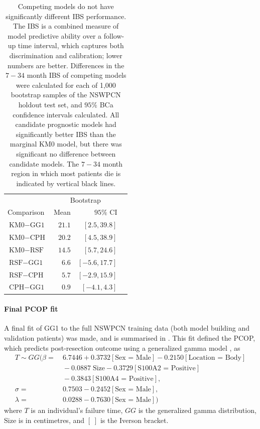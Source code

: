 \documentclass[dissertation.tex]{subfiles}
\begin{document}
\begin{table}
\centering
\caption[Prognostic model \acrshort{IBS} comparison]{Competing models do not have significantly different \gls{IBS} performance.  The \gls{IBS} is a combined measure of model predictive ability over a follow-up time interval, which captures both discrimination and calibration; lower numbers are better.  Differences in the $7-34$ month \gls{IBS} of competing models were calculated for each of 1,000 bootstrap samples of the \gls{NSWPCN} holdout test set, and $95\%$ BCa confidence intervals \cite{Efron1987} calculated.  All candidate prognostic models had significantly better \gls{IBS} than the marginal KM0 model, but there was significant no difference between candidate models.  The $7-34$ month region in which most patients die is indicated by vertical black lines.}
\label{tab:nomo-ibs-boot}
\begin{tabular}{lrrr}
\toprule
                             & \multicolumn{2}{c}{Bootstrap}   \\ \cmidrule(r){2-3}
Comparison                   & Mean          & $95\%$ CI       \\ \midrule
$\mbox{KM0} - \mbox{GG1}$    & $21.1$        & $[2.5, 39.8]$   \\
$\mbox{KM0} - \mbox{CPH}$    & $20.2$        & $[4.5, 38.9]$   \\
$\mbox{KM0} - \mbox{RSF}$    & $14.5$        & $[5.7, 24.6]$   \\
$\mbox{RSF} - \mbox{GG1}$    &  $6.6$        & $[-5.6, 17.7]$  \\
$\mbox{RSF} - \mbox{CPH}$    &  $5.7$        & $[-2.9, 15.9]$  \\ 
$\mbox{CPH} - \mbox{GG1}$    &  $0.9$        & $[-4.1, 4.3]$   \\ \bottomrule
\end{tabular}
\end{table}

\paragraph{Final \acrshort{PCOP} fit}
A final fit of GG1 to the full \gls{NSWPCN} training data (both model building and validation patients) was made, and is summarised in .  This fit defined the \gls{PCOP}, which predicts post-resection outcome using a generalized gamma model \cite{Cox2007}, as
\begin{align*}
T \sim GG(\beta   = &\ 6.7446 + 0.3732[\mbox{Sex = Male}] - 0.2150[\mbox{Location = Body}] \\
                    &\ -0.0887\;\mbox{Size} - 0.3729[\mbox{S100A2 = Positive}] \\
                    &\ -0.3843[\mbox{S100A4 = Positive}], \\ 
          \sigma  = &\ 0.7503 - 0.2452[\mbox{Sex = Male}],\\
          \lambda = &\ 0.0288 - 0.7630[\mbox{Sex = Male}])
\end{align*}
where $T$ is an individual's failure time, $GG$ is the generalized gamma distribution, $\mbox{Size}$ is in centimetres, and $[\;]$ is the Iverson bracket.
\end{document}
